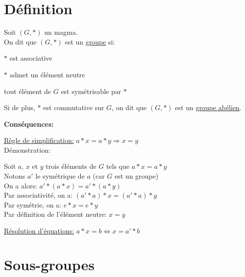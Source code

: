 \documentclass[12pt,twoside,a4paper]{article}
\author{MPSI 2}
\begin{document}
	\maketitle
	\section{D\'efinition}
		\begin{defi}
			Soit $(G,*)$ un magma.\\
			On dit que $(G,*)$ est un \underline{groupe} si:
			\begin{liste}
				\item $*$ est associative
				\item $*$ admet un \'el\'ement neutre
				\item tout \'el\'ement de $G$ est sym\'etrisable par $*$
			\end{liste}
			Si de plus, $*$ est commutative sur $G$, on dit que $(G,*)$ est un \underline{groupe ab\'elien}.
		\end{defi}
		\begin{flushleft}
			\textbf{Cons\'equences:}
			\begin{liste}
				\item\underline{R\`egle de simplification:} $a*x=a*y\Rightarrow x=y$\\
					D\'emonstration:
					\begin{tab}
						Soit $a$, $x$ et $y$ trois \'el\'ements de $G$ tels que $a*x=a*y$\\
						Notons $a'$ le sym\'etrique de $a$ (car $G$ est un groupe)\\
						On a alors: $a'*(a*x)=a'*(a*y)$\\
						Par associativit\'e, on a: $(a'*a)*x=(a'*a)*y$\\
						Par sym\'etrie, on a: $e*x=e*y$\\
						Par d\'efinition de l'\'el\'ement neutre: $x=y$						
					\end{tab}
				\item\underline{R\'esolution d'\'equations:} $a*x=b\iff x=a'*b$
			\end{liste}
		\end{flushleft}
	\section{Sous-groupes}
\end{document}

